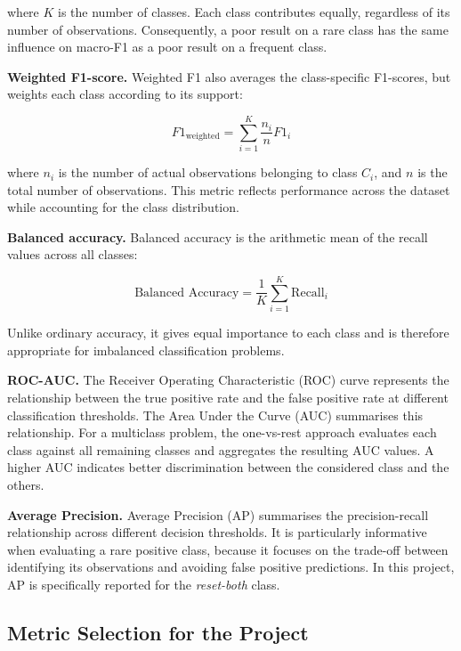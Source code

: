 where $K$ is the number of classes. Each class contributes equally, regardless of its number of observations. Consequently, a poor result on a rare class has the same influence on macro-F1 as a poor result on a frequent class.

\textbf{Weighted F1-score.} Weighted F1 also averages the class-specific F1-scores, but weights each class according to its support:

\begin{equation}
F1_{\text{weighted}} =
\sum_{i=1}^{K}\frac{n_i}{n}F1_i
\label{eq:weighted_f1}
\end{equation}

where $n_i$ is the number of actual observations belonging to class $C_i$, and $n$ is the total number of observations. This metric reflects performance across the dataset while accounting for the class distribution.

\textbf{Balanced accuracy.} Balanced accuracy is the arithmetic mean of the recall values across all classes:

\begin{equation}
\text{Balanced Accuracy} =
\frac{1}{K}\sum_{i=1}^{K}\text{Recall}_i
\label{eq:balanced_accuracy}
\end{equation}

Unlike ordinary accuracy, it gives equal importance to each class and is therefore appropriate for imbalanced classification problems.

\textbf{ROC-AUC.} The Receiver Operating Characteristic (ROC) curve represents the relationship between the true positive rate and the false positive rate at different classification thresholds. The Area Under the Curve (AUC) summarises this relationship. For a multiclass problem, the one-vs-rest approach evaluates each class against all remaining classes and aggregates the resulting AUC values. A higher AUC indicates better discrimination between the considered class and the others.

\textbf{Average Precision.} Average Precision (AP) summarises the precision-recall relationship across different decision thresholds. It is particularly informative when evaluating a rare positive class, because it focuses on the trade-off between identifying its observations and avoiding false positive predictions. In this project, AP is specifically reported for the \emph{reset-both} class.

\subsection{Metric Selection for the Project}


